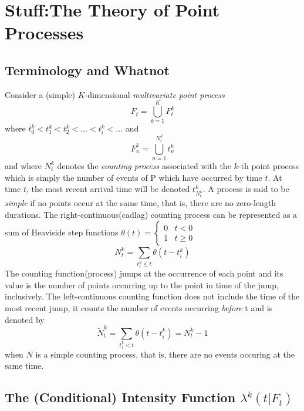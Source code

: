 \documentclass{article}
\newcommand{\tmem}[1]{{\em #1\/}}
\begin{document}
\section{Stuff:The Theory of Point Processes}

\subsection{Terminology and Whatnot}

Consider a (simple) $K$-dimensional {\tmem{multivariate point process}}
\begin{equation}
  F_t = \bigcup_{k = 1}^K F^k_t
\end{equation}
where $t_0^k < t_1^k < t_2^k < \ldots < t_i^k < \ldots$ and
\begin{equation}
  F^k_n = \bigcup_{n = 1}^{N^k_t} t^k_n
\end{equation}
and where $N^k_t$ denotes the {\tmem{counting process}} associated with the
$k$-th point process which is simply the number of events of P which have
occurred by time $t$. At time $t$, the most recent arrival time will be
denoted $t_{N^k_t}^k$. A process is said to be {\tmem{simple}} if no points
occur at the same time, that is, there are no zero-length durations. The
right-continuous(cadlag) counting
process{\cite[4.1.1.2]{hautsch2011econometrics}} can be represented as a sum
of Heaviside step functions $\theta ( t) = \left\{ \begin{array}{ll}
  0 & t < 0\\
  1 & t \geqslant 0
\end{array} \right.$
\begin{equation}
  N^k_t = \sum_{t_i^k \leqslant t}^{} \theta ( t - t_i^k)
\end{equation}
The counting function(process) jumps at the occurrence of each point and its
value is the number of points occurring up to the point in time of the jump,
inclusively. The left-continuous counting function does not include the time
of the most recent jump, it counts the number of events occurring
{\tmem{before}} t and is denoted by
\begin{equation}
  \breve{N}^k_t = \sum_{t_i^k < t} \theta ( t - t_i^k) = N_t^k - 1
\end{equation}
when $N$ is a simple counting process, that is, there are no events occuring
at the same time.

\subsection{The (Conditional) Intensity Function $\lambda^k ( t | F^{}_t)$}
\end{document}
